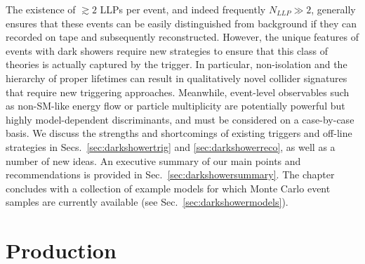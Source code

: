 The existence of $\gtrsim 2$ LLPs per event, and indeed frequently $N_{LLP}\gg 2$, generally ensures that these events can be easily distinguished from background if they can recorded on tape and subsequently reconstructed. However, the unique features of events with dark showers require new strategies to ensure that this class of theories is actually captured by the trigger. In particular, non-isolation and the hierarchy of proper lifetimes can result in qualitatively novel collider signatures that require new triggering approaches. Meanwhile, event-level observables such as non-SM-like energy flow or particle multiplicity are potentially powerful but highly model-dependent discriminants, and must be considered on a case-by-case basis. We discuss the strengths and shortcomings of existing triggers and off-line strategies in Secs.~\ref{sec:darkshowertrig} and \ref{sec:darkshowerreco}, as well as a number of new ideas. An executive summary of our main points and recommendations is provided in Sec.~\ref{sec:darkshowersummary}. The chapter concludes with a collection of example models for which Monte Carlo event samples are currently available (see Sec.~\ref{sec:darkshowermodels}).

\section{Production}
\label{sec:darkshowerprod}


